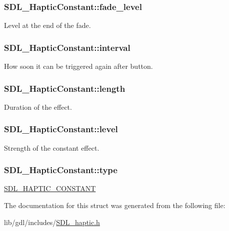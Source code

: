 \subsubsection[{fade\+\_\+level}]{ S\+D\+L\+\_\+\+Haptic\+Constant\+::fade\+\_\+level}\label{struct_s_d_l___haptic_constant_a49f6499c89f3e494efbe92f12277c949}
Level at the end of the fade. \hypertarget{struct_s_d_l___haptic_constant_ab1f7f0df856f4cf1fdf937cb886226b4}{}
\subsubsection[{interval}]{ S\+D\+L\+\_\+\+Haptic\+Constant\+::interval}\label{struct_s_d_l___haptic_constant_ab1f7f0df856f4cf1fdf937cb886226b4}
How soon it can be triggered again after button. \hypertarget{struct_s_d_l___haptic_constant_aeb994c356b1d236b060f277d157e98ec}{}
\subsubsection[{length}]{ S\+D\+L\+\_\+\+Haptic\+Constant\+::length}\label{struct_s_d_l___haptic_constant_aeb994c356b1d236b060f277d157e98ec}
Duration of the effect. \hypertarget{struct_s_d_l___haptic_constant_a5b095eea77464623ed57af15f29f4ca6}{}
\subsubsection[{level}]{ S\+D\+L\+\_\+\+Haptic\+Constant\+::level}\label{struct_s_d_l___haptic_constant_a5b095eea77464623ed57af15f29f4ca6}
Strength of the constant effect. \hypertarget{struct_s_d_l___haptic_constant_a5cb31202803a8bc1be95fcede5ac8afb}{}
\subsubsection[{type}]{ S\+D\+L\+\_\+\+Haptic\+Constant\+::type}\label{struct_s_d_l___haptic_constant_a5cb31202803a8bc1be95fcede5ac8afb}
\hyperlink{_s_d_l__haptic_8h_a955fb9f680dcf9cc72a3d5263e85b80a}{S\+D\+L\+\_\+\+H\+A\+P\+T\+I\+C\+\_\+\+C\+O\+N\+S\+T\+A\+N\+T} 

The documentation for this struct was generated from the following file\+:\begin{DoxyCompactItemize}
\item 
lib/gdl/includes/\hyperlink{_s_d_l__haptic_8h}{S\+D\+L\+\_\+haptic.\+h}\end{DoxyCompactItemize}
